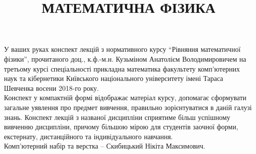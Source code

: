 \documentclass[a5paper, 10pt]{article}
\title{{\Huge МАТЕМАТИЧНА ФІЗИКА}}
\date{}
\numberwithin{equation}{subsection}
\theoremstyle{definition}
\begin{document}
\maketitle \thispagestyle{empty} \newpage 

У ваших руках конспект лекцій з нормативного курсу ``Рівняння математичної фізики'', прочитаного доц., к.ф.-м.н. Кузьміном Анатолієм Володимировичем на третьому курсі спеціальності прикладна математика факультету комп'ютерних наук та кібернетики Київського національного університету імені Тараса Шевченка восени 2018-го року. \\

Конспект у компактній формі відображає матеріал курсу, допомагає сформувати загальне уявлення про предмет вивчення, правильно зорієнтуватися в даній галузі знань. Конспект лекцій з названої дисципліни сприятиме більш успішному вивченню дисципліни, причому більшою мірою для студентів заочної форми, екстернату, дистанційного та індивідуального навчання. \\

Комп'ютерний набір та верстка -- Скибицький Нікіта Максимович. \newpage

\tableofcontents \newpage
















\end{document}
